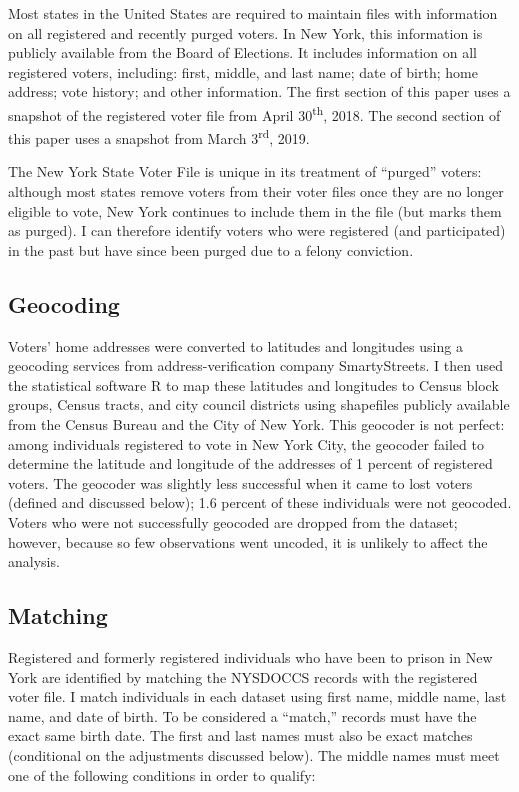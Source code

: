 \documentclass[
  12pt,
]{article}
\begin{document}
Most states in the United States are required to maintain files with information on all registered and recently purged voters. In New York, this information is publicly available from the Board of Elections. It includes information on all registered voters, including: first, middle, and last name; date of birth; home address; vote history; and other information. The first section of this paper uses a snapshot of the registered voter file from April 30\textsuperscript{th}, 2018. The second section of this paper uses a snapshot from March 3\textsuperscript{rd}, 2019.

The New York State Voter File is unique in its treatment of ``purged'' voters: although most states remove voters from their voter files once they are no longer eligible to vote, New York continues to include them in the file (but marks them as purged). I can therefore identify voters who were registered (and participated) in the past but have since been purged due to a felony conviction.

\hypertarget{geocoding}{%
\subsection*{Geocoding}\label{geocoding}}

Voters' home addresses were converted to latitudes and longitudes using a geocoding services from address-verification company SmartyStreets. I then used the statistical software R to map these latitudes and longitudes to Census block groups, Census tracts, and city council districts using shapefiles publicly available from the Census Bureau and the City of New York. This geocoder is not perfect: among individuals registered to vote in New York City, the geocoder failed to determine the latitude and longitude of the addresses of 1 percent of registered voters. The geocoder was slightly less successful when it came to lost voters (defined and discussed below); 1.6 percent of these individuals were not geocoded. Voters who were not successfully geocoded are dropped from the dataset; however, because so few observations went uncoded, it is unlikely to affect the analysis.

\hypertarget{matching}{%
\subsection*{Matching}\label{matching}}

Registered and formerly registered individuals who have been to prison in New York are identified by matching the NYSDOCCS records with the registered voter file. I match individuals in each dataset using first name, middle name, last name, and date of birth. To be considered a ``match,'' records must have the exact same birth date. The first and last names must also be exact matches (conditional on the adjustments discussed below). The middle names must meet one of the following conditions in order to qualify:
\end{document}
